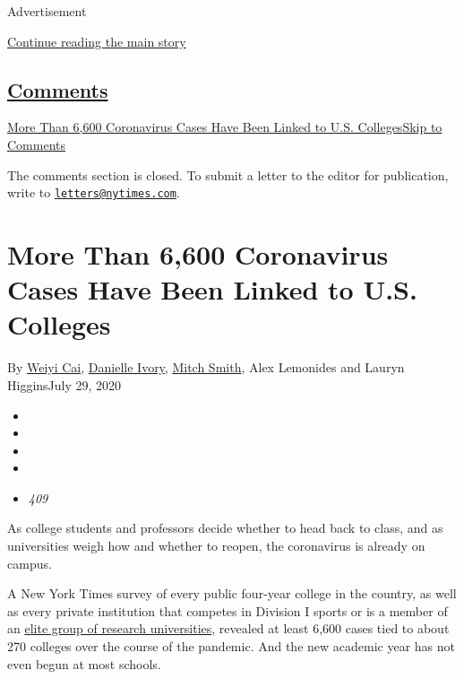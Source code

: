 Advertisement

\protect\hyperlink{after-top}{Continue reading the main story}

\hypertarget{comments}{%
\subsection{\texorpdfstring{\protect\hyperlink{commentsContainer}{Comments}}{Comments}}\label{comments}}

\href{}{More Than 6,600 Coronavirus Cases Have Been Linked to U.S.
Colleges}\href{}{Skip to Comments}

The comments section is closed. To submit a letter to the editor for
publication, write to
\href{mailto:letters@nytimes.com}{\nolinkurl{letters@nytimes.com}}.

\hypertarget{more-than-6600-coronavirus-cases-have-been-linked-to-us-colleges}{%
\section{More Than 6,600 Coronavirus Cases Have Been Linked to U.S.
Colleges}\label{more-than-6600-coronavirus-cases-have-been-linked-to-us-colleges}}

By \href{https://www.nytimes.com/by/weiyi-cai}{Weiyi Cai},
\href{https://www.nytimes.com/by/danielle-ivory}{Danielle Ivory},
\href{https://www.nytimes.com/by/mitch-smith}{Mitch Smith}, Alex
Lemonides and Lauryn HigginsJuly 29, 2020

\begin{itemize}
\item
\item
\item
\item
\item
  \emph{409}
\end{itemize}

As college students and professors decide whether to head back to class,
and as universities weigh how and whether to reopen, the coronavirus is
already on campus.

A New York Times survey of every public four-year college in the
country, as well as every private institution that competes in Division
I sports or is a member of an
\href{https://www.aau.edu/sites/default/files/AAU-Files/Who-We-Are/AAU-Member-List.pdf}{elite
group of research universities}, revealed at least 6,600 cases tied to
about 270 colleges over the course of the pandemic. And the new academic
year has not even begun at most schools.


